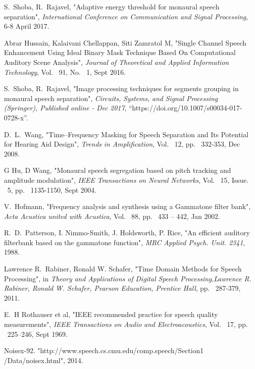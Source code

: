 \documentclass[a4paper]{article}
\begin{document}
\begin{thebibliography}{9}
S.\ Shoba, R.\ Rajavel, "Adaptive energy threshold for monaural speech separation", \textit{International Conference on Communication and Signal Processing}, 6-8 April 2017.

Abrar Hussain, Kalaivani Chellappan, Siti Zamratol M, "Single Channel Speech Enhancement Using Ideal Binary Mask Technique Based On Computational Auditory Scene Analysis", \textit{Journal of Theoretical and Applied Information Technology}, Vol. ~91, No. ~1, Sept 2016.         

S.\ Shoba, R.\ Rajavel, "Image processing techniques for segments grouping in monaural speech separation", \textit{Circuits, Systems, and Signal Processing (Springer), Published online - Dec 2017}, “https://doi.org/10.1007/s00034-017-0728-x”.         

D.\ L.\ Wang, "Time–Frequency Masking for Speech Separation and Its Potential for Hearing Aid Design", \textit{Trends in Amplification}, Vol. ~12, pp. ~332-353, Dec 2008.         

G Hu, D Wang, "Monaural speech segregation based on pitch tracking and amplitude modulation", \textit{IEEE Transactions on Neural Networks}, Vol. ~15, Issue. ~5, pp. ~1135-1150, Sept 2004.         

V.\ Hofmann, "Frequency analysis and synthesis using a Gammatone filter bank", \textit{Acta Acustica united with Acustica}, Vol. ~88, pp. ~433 – 442, Jan 2002.        

R.\ D.\ Patterson, I. Nimmo-Smith, J. Holdsworth, P. Rice, "An efficient auditory filterbank based on the gammatone function", \textit{MRC Applied Psych. Unit. 2341}, 1988.    

Lawrence R.\ Rabiner, Ronald W. Schafer, "Time Domain Methods for Speech Processing", in \textit{Theory and Applications of Digital Speech Processing,Lawrence R. Rabiner, Ronald W. Schafer, Pearson Education, Prentice Hall}, pp. ~287-379, 2011.            

E.\ H Rothauser et al, "IEEE recommended practice for speech quality measurements", \textit{IEEE Transactions on Audio and Electroacoustics}, Vol. ~17, pp. ~225–246, Sept 1969.        

Noisex-92. "http://www.speech.cs.cmu.edu/comp.speech/Section1\\/Data/noisex.html", 2014.           


\end{thebibliography}
\end{document}
